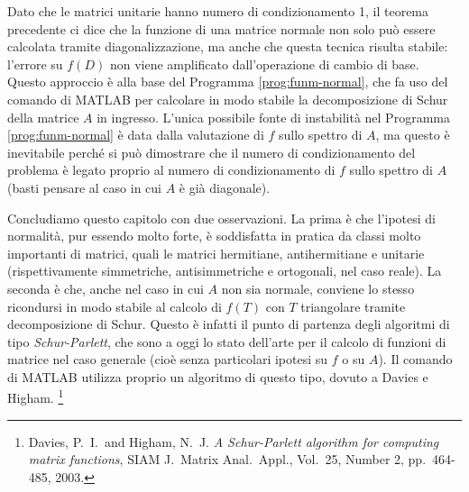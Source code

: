 Dato che le matrici unitarie hanno numero di condizionamento 1,
il teorema precedente ci dice che la funzione di una matrice normale
non solo può essere calcolata tramite diagonalizzazione, ma anche
che questa tecnica risulta stabile:
l'errore su $f(D)$ non viene amplificato dall'operazione di cambio di base.
Questo approccio è alla base del Programma \ref{prog:funm-normal},
che fa uso del comando  di MATLAB per calcolare in modo
stabile la decomposizione di Schur della matrice $A$ in ingresso.
L'unica possibile fonte di instabilità nel Programma \ref{prog:funm-normal}
è data dalla valutazione di $f$ sullo spettro di $A$,
ma questo è inevitabile perché si può dimostrare che il
numero di condizionamento del problema è legato proprio al numero
di condizionamento di $f$ sullo spettro di $A$
(basti pensare al caso in cui $A$ è già diagonale).



Concludiamo questo capitolo con due osservazioni.
La prima è che l'ipotesi di normalità, pur essendo molto forte,
è soddisfatta in pratica da classi molto importanti di matrici, quali
le matrici hermitiane, antihermitiane e unitarie (rispettivamente
simmetriche, antisimmetriche e ortogonali, nel caso reale).
La seconda è che, anche nel caso in cui $A$ non sia normale,
conviene lo stesso ricondursi in modo stabile al calcolo di $f(T)$ con
$T$ triangolare tramite decomposizione di Schur.
Questo è infatti il punto di partenza degli algoritmi di tipo
\emph{Schur-Parlett}, che sono a oggi lo stato dell'arte per
il calcolo di funzioni di matrice nel caso generale (cioè senza
particolari ipotesi su $f$ o su $A$).
Il comando  di MATLAB utilizza proprio un algoritmo
di questo tipo, dovuto a Davies e Higham.%
\footnote{Davies, P.\ I.\ and Higham, N.\ J.
\emph{A Schur-Parlett algorithm for computing matrix functions},
SIAM J.\ Matrix Anal.\ Appl., Vol.\ 25, Number 2, pp.\ 464-485, 2003.}










